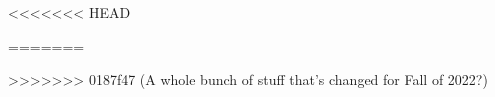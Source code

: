 \author[TML]{Dr.\ Timothy Leung}
<<<<<<< HEAD
\date{Updated: Summer 2022}
=======
\date{Fall 2022}
>>>>>>> 0187f47 (A whole bunch of stuff that's changed for Fall of 2022?)
